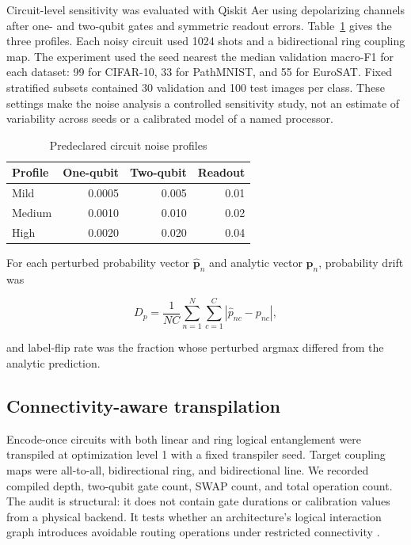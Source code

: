 \documentclass[pdflatex,sn-mathphys-num]{sn-jnl}
\begin{document}
Circuit-level sensitivity was evaluated with Qiskit Aer using depolarizing channels after one- and two-qubit gates and symmetric readout errors. Table~\ref{tab:noiseprofiles} gives the three profiles. Each noisy circuit used 1024 shots and a bidirectional ring coupling map. The experiment used the seed nearest the median validation macro-F1 for each dataset: 99 for CIFAR-10, 33 for PathMNIST, and 55 for EuroSAT. Fixed stratified subsets contained 30 validation and 100 test images per class. These settings make the noise analysis a controlled sensitivity study, not an estimate of variability across seeds or a calibrated model of a named processor.

\begin{table}[htbp]
\caption{Predeclared circuit noise profiles}\label{tab:noiseprofiles}
\centering
\scriptsize
\begin{tabular}{@{}lrrr@{}}
\toprule
\textbf{Profile} & \textbf{One-qubit} & \textbf{Two-qubit} & \textbf{Readout} \\
\midrule
Mild & 0.0005 & 0.005 & 0.01 \\
Medium & 0.0010 & 0.010 & 0.02 \\
High & 0.0020 & 0.020 & 0.04 \\
\bottomrule
\end{tabular}
\end{table}

For each perturbed probability vector $\widehat{\boldsymbol p}_n$ and analytic vector $\boldsymbol p_n$, probability drift was

\begin{equation}
D_p=\frac{1}{NC}\sum_{n=1}^{N}\sum_{c=1}^{C}\left|\widehat p_{nc}-p_{nc}\right|,
\label{eq:drift}
\end{equation}

and label-flip rate was the fraction whose perturbed argmax differed from the analytic prediction.

\subsection{Connectivity-aware transpilation}

Encode-once circuits with both linear and ring logical entanglement were transpiled at optimization level 1 with a fixed transpiler seed. Target coupling maps were all-to-all, bidirectional ring, and bidirectional line. We recorded compiled depth, two-qubit gate count, SWAP count, and total operation count. The audit is structural: it does not contain gate durations or calibration values from a physical backend. It tests whether an architecture's logical interaction graph introduces avoidable routing operations under restricted connectivity \cite{LI-2019,MURALI-2019}.
\end{document}
